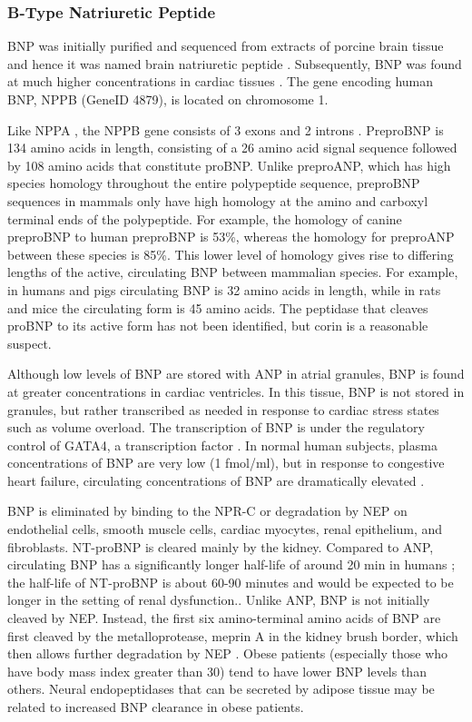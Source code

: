\documentclass[14pt,a4paper,onecolumn]{extarticle}
\begin{document}
\subsubsection{B-Type Natriuretic Peptide}
BNP was initially purified and sequenced from extracts of porcine brain tissue and hence it was named brain natriuretic peptide \citep{Sudoh1988}. Subsequently, BNP was found at much higher concentrations in cardiac tissues \citep{Mukoyama1991} \citep{Mukoyama1990}. The gene encoding human BNP, NPPB (GeneID 4879), is located on chromosome 1.

Like NPPA , the NPPB gene consists of 3 exons and 2 introns \citep{Ogawa1994a}. PreproBNP is 134 amino acids in length, consisting of a 26 amino acid signal sequence followed by 108 amino acids that constitute proBNP. Unlike preproANP, which has high species homology throughout the entire polypeptide sequence, preproBNP sequences in mammals only have high homology at the amino and carboxyl terminal ends of the polypeptide. For example, the homology of canine preproBNP to human preproBNP is 53\%, whereas the homology for preproANP between these species is 85\%. This lower level of homology gives rise to differing lengths of the active, circulating BNP between mammalian species. For example, in humans and pigs circulating BNP is 32 amino acids in length, while in rats and mice the circulating form is 45 amino acids. The peptidase that cleaves proBNP to its active form has not been identified, but corin is a reasonable suspect.

Although low levels of BNP are stored with ANP in atrial granules, BNP is found at greater concentrations in cardiac ventricles. In this tissue, BNP is not stored in granules, but rather transcribed as needed in response to cardiac stress states such as volume overload. The transcription of BNP is under the regulatory control of GATA4, a transcription factor \citep{Grepin1994} \citep{Thuerauf1994}. In normal human subjects, plasma concentrations of BNP are very low (1 fmol/ml), but in response to congestive heart failure, circulating concentrations of BNP are dramatically elevated \citep{Mukoyama1991} \citep{Mukoyama1990}.

BNP is eliminated by binding to the NPR-C or degradation by NEP on endothelial cells, smooth muscle cells, cardiac myocytes, renal epithelium, and fibroblasts. NT-proBNP is cleared mainly by the kidney.\citep{Schrier1999}  Compared to ANP, circulating BNP has a significantly longer half-life of around 20 min in humans \citep{Mukoyama1991} \citep{Mukoyama1990}; the half-life of NT-proBNP is about 60-90 minutes and would be expected to be longer in the setting of renal dysfunction.. Unlike ANP, BNP is not initially cleaved by NEP. Instead, the first six amino-terminal amino acids of BNP are first cleaved by the metalloprotease, meprin A in the kidney brush border, which then allows further degradation by NEP \citep{Pankow2007}. Obese patients (especially those who have body mass index greater than 30) tend to have lower BNP levels than others. Neural endopeptidases that can be secreted by adipose tissue may be related to increased BNP clearance in obese patients.\citep{Young2004}
\end{document}

